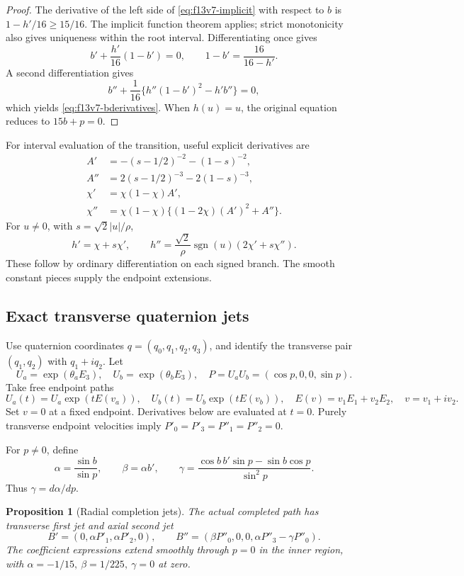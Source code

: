 \documentclass[11pt,oneside]{article}
\newtheorem{proposition}[theorem]{Proposition}
\begin{document}
\begin{proof}
The derivative of the left side of
\eqref{eq:f13v7-implicit} with respect to \(b\)
is \(1-h'/16\ge15/16\). The implicit function
theorem applies; strict monotonicity also gives
uniqueness within the root interval.
Differentiating once gives
\[
 b'+\frac{h'}{16}(1-b')=0,\qquad
 1-b'=\frac{16}{16-h'}.
\]
A second differentiation gives
\[
 b''+\frac1{16}
       \{h''(1-b')^2-h'b''\}=0 ,
\]
which yields \eqref{eq:f13v7-bderivatives}.
When \(h(u)=u\), the original equation reduces
to \(15b+p=0\).
\end{proof}

For interval evaluation of the transition, useful
explicit derivatives are
\[
\begin{split}
 A'&=-(s-1/2)^{-2}-(1-s)^{-2},\\
 A''&=2(s-1/2)^{-3}-2(1-s)^{-3},\\
 \chi'&=\chi(1-\chi)A',\\
 \chi''&=\chi(1-\chi)
           \{(1-2\chi)(A')^2+A''\}.
\end{split}
\]
For \(u\ne0\), with \(s=\sqrt2|u|/\rho\),
\[
 h'=\chi+s\chi',\qquad
 h''=\frac{\sqrt2}{\rho}\operatorname{sgn}(u)
                         (2\chi'+s\chi'').
\]
These follow by ordinary differentiation on
each signed branch. The smooth constant pieces
supply the endpoint extensions.

\subsection{Exact transverse quaternion jets}

Use quaternion coordinates
\(q=(q_0,q_1,q_2,q_3)\), and identify the transverse
pair \((q_1,q_2)\) with \(q_1+iq_2\).
Let
\[
 U_a=\exp(\theta_aE_3),\quad
 U_b=\exp(\theta_bE_3),\quad
 P=U_aU_b=(\cos p,0,0,\sin p).
\]
Take free endpoint paths
\[
 U_a(t)=U_a\exp(tE(v_a)),\quad
 U_b(t)=U_b\exp(tE(v_b)),\quad
 E(v)=v_1E_1+v_2E_2,\quad v=v_1+iv_2.
\]
Set \(v=0\) at a fixed endpoint.
Derivatives below are evaluated at \(t=0\).
Purely transverse endpoint velocities imply
\(P'_0=P'_3=P''_1=P''_2=0\).

For \(p\ne0\), define
\begin{equation}\label{eq:f13v7-coefficients}
 \alpha=\frac{\sin b}{\sin p},\qquad
 \beta=\alpha b',\qquad
 \gamma=\frac{\cos b\,b'\sin p-\sin b\cos p}{\sin^2p}.
\end{equation}
Thus \(\gamma=d\alpha/dp\).

\begin{proposition}[Radial completion jets]
\label{prop:f13v7-jets}
The actual completed path has transverse first jet
and axial second jet
\begin{equation}\label{eq:f13v7-jets}
 B'=(0,\alpha P'_1,\alpha P'_2,0),\qquad
 B''=(\beta P''_0,0,0,\alpha P''_3-\gamma P''_0).
\end{equation}
The coefficient expressions extend smoothly
through \(p=0\) in the inner region, with
\(\alpha=-1/15,\ \beta=1/225,\ \gamma=0\)
at zero.
\end{proposition}
\end{document}
